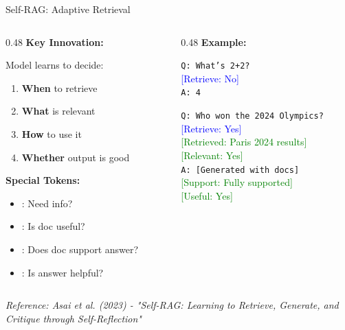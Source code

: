 \documentclass[aspectratio=169]{beamer}
\begin{document}
\begin{frame}[shrink=10]{Self-RAG: Adaptive Retrieval 🎯}
\begin{columns}[T]
\begin{column}{0.48\textwidth}
\textbf{Key Innovation:}

Model learns to decide:
\begin{enumerate}\setlength{\itemsep}{0pt}
    \item \textbf{When} to retrieve
    \item \textbf{What} is relevant
    \item \textbf{How} to use it
    \item \textbf{Whether} output is good
\end{enumerate}

\vspace{0.5em}

\textbf{Special Tokens:}
\begin{itemize}\setlength{\itemsep}{0pt}
    \item [Retrieve]: Need info?
    \item [Relevant]: Is doc useful?
    \item [Support]: Does doc support answer?
    \item [Useful]: Is answer helpful?
\end{itemize}
\end{column}

\begin{column}{0.48\textwidth}
\textbf{Example:}

\vspace{0.3em}

\texttt{Q: What's 2+2?}\\
\textcolor{blue}{[Retrieve: No]}\\
\texttt{A: 4}

\vspace{0.5em}

\texttt{Q: Who won the 2024 Olympics?}\\
\textcolor{blue}{[Retrieve: Yes]}\\
\textcolor{green}{[Retrieved: Paris 2024 results]}\\
\textcolor{green}{[Relevant: Yes]}\\
\texttt{A: [Generated with docs]}\\
\textcolor{green}{[Support: Fully supported]}\\
\textcolor{green}{[Useful: Yes]}
\end{column}
\end{columns}

\vspace{0.5em}

\small
\textit{Reference: Asai et al. (2023) - "Self-RAG: Learning to Retrieve, Generate, and Critique through Self-Reflection"}
\end{frame}
\end{document}
